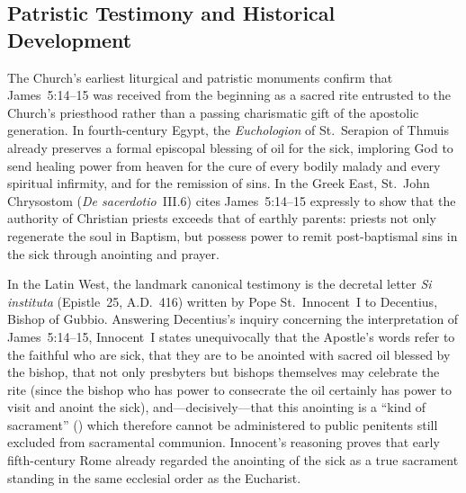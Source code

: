 \subsection{Patristic Testimony and Historical Development}
\label{subsec:anointing-patristics}

The Church's earliest liturgical and patristic monuments confirm that James~5:14--15 was received from the beginning as a sacred rite entrusted to the Church's priesthood rather than a passing charismatic gift of the apostolic generation. In fourth-century Egypt, the \emph{Euchologion} of St.~Serapion of Thmuis already preserves a formal episcopal blessing of oil for the sick, imploring God to send healing power from heaven for the cure of every bodily malady and every spiritual infirmity, and for the remission of sins. In the Greek East, St.~John Chrysostom (\emph{De sacerdotio}~III.6) cites James~5:14--15 expressly to show that the authority of Christian priests exceeds that of earthly parents: priests not only regenerate the soul in Baptism, but possess power to remit post-baptismal sins in the sick through anointing and prayer.

In the Latin West, the landmark canonical testimony is the decretal letter \emph{Si instituta} (Epistle~25, A.D.~416) written by Pope St.~Innocent~I to Decentius, Bishop of Gubbio. Answering Decentius's inquiry concerning the interpretation of James~5:14--15, Innocent~I states unequivocally that the Apostle's words refer to the faithful who are sick, that they are to be anointed with sacred oil blessed by the bishop, that not only presbyters but bishops themselves may celebrate the rite (since the bishop who has power to consecrate the oil certainly has power to visit and anoint the sick), and---decisively---that this anointing is a ``kind of sacrament'' () which therefore cannot be administered to public penitents still excluded from sacramental communion. Innocent's reasoning proves that early fifth-century Rome already regarded the anointing of the sick as a true sacrament standing in the same ecclesial order as the Eucharist.

